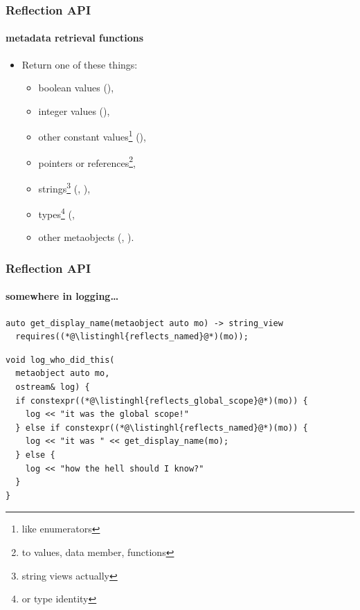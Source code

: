\documentclass[compress,table,xcolor=table]{beamer}
\begin{document}
\begin{frame}
  \frametitle{Reflection API}
  \framesubtitle{metadata retrieval functions}
  \larger
  \begin{itemize}
  \item Return one of these things:
    \begin{itemize}
      \smaller
      \item boolean values (),
      \item integer values (),
      \item other constant values\footnote{like enumerators} (),
      \item pointers or references\footnote{to values, data member, functions},
      \item strings\footnote{string views actually} (,
        ),
      \item types\footnote{or type identity} (,
      \item other metaobjects (, ).
    \end{itemize}
  \end{itemize}
\end{frame}
\begin{frame}[fragile]
  \frametitle{Reflection API}
  \framesubtitle{somewhere in logging\ldots}
  \begin{lstlisting}[language=c++2x,basicstyle=\scriptsize\ttfamily]
auto get_display_name(metaobject auto mo) -> string_view
  requires((*@\listinghl{reflects_named}@*)(mo));
  \end{lstlisting}
  \begin{lstlisting}[language=c++2x,basicstyle=\footnotesize\ttfamily]
void log_who_did_this(
  metaobject auto mo,
  ostream& log) {
  if constexpr((*@\listinghl{reflects_global_scope}@*)(mo)) {
    log << "it was the global scope!"
  } else if constexpr((*@\listinghl{reflects_named}@*)(mo)) {
    log << "it was " << get_display_name(mo);
  } else {
    log << "how the hell should I know?"
  }
}
  \end{lstlisting}
\end{frame}
\end{document}
